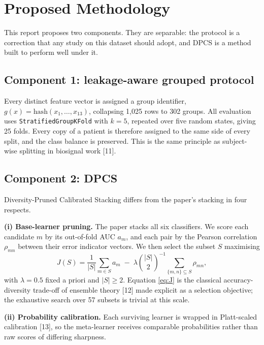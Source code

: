 \documentclass[11pt,a4paper]{article}
\begin{document}
\section{Proposed Methodology}\label{sec:dpcs}

This report proposes two components. They are separable: the protocol is a correction that
any study on this dataset should adopt, and DPCS is a method built to perform
well under it.

\subsection{Component 1: leakage-aware grouped protocol}\label{sec:protocolB}
Every distinct feature vector is assigned a group identifier,
$g(x)=\text{hash}(x_1,\dots,x_{13})$, collapsing 1{,}025 rows to 302 groups. All
evaluation uses \texttt{StratifiedGroupKFold} with $k=5$, repeated over five
random states, giving 25 folds. Every copy of a patient is therefore assigned to
the same side of every split, and the class balance is preserved. This is the
same principle as subject-wise splitting in biosignal work
[11].

\subsection{Component 2: DPCS}
Diversity-Pruned Calibrated Stacking differs from the paper's stacking in four
respects.

\textbf{(i) Base-learner pruning.} The paper stacks all six classifiers. We score
each candidate $m$ by its out-of-fold AUC $a_m$, and each pair by the Pearson
correlation $\rho_{mn}$ between their error indicator vectors. We then select the
subset $S$ maximising
\begin{equation}
J(S)=\frac{1}{|S|}\sum_{m\in S} a_m
      \;-\; \lambda \binom{|S|}{2}^{-1}\!\!\!\sum_{\{m,n\}\subseteq S}\!\!\rho_{mn},
\label{eq:J}
\end{equation}
with $\lambda=0.5$ fixed a priori and $|S|\ge 2$. Equation \eqref{eq:J} is the
classical accuracy-diversity trade-off of ensemble theory [12]
made explicit as a selection objective; the exhaustive search over 57 subsets is
trivial at this scale.

\textbf{(ii) Probability calibration.} Each surviving learner is wrapped in
Platt-scaled calibration [13], so the meta-learner receives
comparable probabilities rather than raw scores of differing sharpness.
\end{document}
